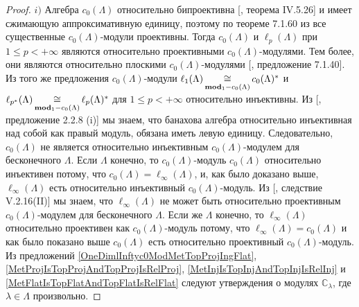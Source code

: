 \begin{proof} $i)$ Алгебра $c_0(\Lambda)$ относительно бипроективна [\cite{HelHomolBanTopAlg}, теорема IV.5.26] и имеет сжимающую аппроксимативную единицу, поэтому по теореме 7.1.60 из \cite{HelBanLocConvAlg} все существенные $c_0(\Lambda)$-модули проективны. Тогда $c_0(\Lambda)$ и $\ell_p(\Lambda)$ при $1\leq p<+\infty$ являются относительно проективными $c_0(\Lambda)$-модулями. Тем более, они являются относительно плоскими $c_0(\Lambda)$-модулями [\cite{HelBanLocConvAlg}, предложение 7.1.40]. Из того же предложения $c_0(\Lambda)$-модули $\ell_1(\Lambda)\mathop{\mathbin{\cong}}\limits_{\mathbf{mod}_1-c_0(\Lambda)}c_0(\Lambda)^*$ и $\ell_{p^*}(\Lambda)\mathop{\mathbin{\cong}}\limits_{\mathbf{mod}_1-c_0(\Lambda)}\ell_p(\Lambda)^*$ для $1\leq p<+\infty$ относительно инъективны. Из [\cite{RamsHomPropSemgroupAlg}, предложение 2.2.8 (i)] мы знаем, что банахова алгебра относительно инъективная над собой как правый модуль, обязана иметь левую единицу. Следовательно, $c_0(\Lambda)$ не является относительно инъективным $c_0(\Lambda)$-модулем для бесконечного $\Lambda$. Если $\Lambda$ конечно, то $c_0(\Lambda)$-модуль $c_0(\Lambda)$  относительно инъективен потому, что $c_0(\Lambda)=\ell_\infty(\Lambda)$, и, как было доказано выше, $\ell_\infty(\Lambda)$ есть относительно инъективный $c_0(\Lambda)$-модуль. Из [\cite{HelHomolBanTopAlg}, следствие V.2.16(II)] мы знаем, что $\ell_\infty(\Lambda)$ не может быть относительно проективным $c_0(\Lambda)$-модулем для бесконечного $\Lambda$. Если же $\Lambda$ конечно, то $\ell_\infty(\Lambda)$ относительно проективен как $c_0(\Lambda)$-модуль потому, что  $\ell_\infty(\Lambda)=c_0(\Lambda)$ и как было показано выше $c_0(\Lambda)$ есть относительно проективный $c_0(\Lambda)$-модуль. Из предложений \ref{OneDimlInftyc0ModMetTopProjIngFlat}, \ref{MetProjIsTopProjAndTopProjIsRelProj}, \ref{MetInjIsTopInjAndTopInjIsRelInj} и \ref{MetFlatIsTopFlatAndTopFlatIsRelFlat} следуют утверждения о модулях $\mathbb{C}_\lambda$, где $\lambda\in\Lambda$ произвольно.


\end{proof}
